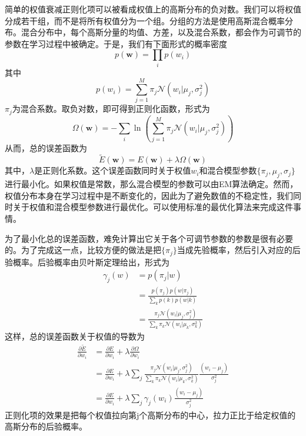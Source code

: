 简单的权值衰减正则化项可以被看成权值上的高斯分布的负对数。我们可以将权值分成若干组，而不是将所有权值分为一个组。分组的方法是使用高斯混合概率分布。混合分布中，每个高斯分量的均值、方差，以及混合系数，都会作为可调节的参数在学习过程中被确定。于是，我们有下面形式的概率密度
\begin{equation}
	p(\boldsymbol{w})=\prod_ip(w_i)
\end{equation}
其中
\begin{equation}
	p(w_i)=\sum_{j=1}^{M}\pi_j\mathcal{N}(w_i|\mu_j,\sigma_j^2)
\end{equation}
$\pi_j$为混合系数。取负对数，即可得到正则化函数，形式为
\begin{equation}
	\Omega(\boldsymbol{w})=-\sum_i\ln\left(\sum_{j=1}^{M}\pi_j\mathcal{N}(w_i|\mu_j,\sigma_j^2) \right)
\end{equation}
从而，总的误差函数为
\begin{equation}
	\tilde{E}(\boldsymbol{w})=E(\boldsymbol{w})+\lambda \Omega(\boldsymbol{w})
\end{equation}
其中，$\lambda$是正则化系数。这个误差函数同时关于权值$w_i$和混合模型参数$\{\pi_j,\mu_j,\sigma_j \}$进行最小化。如果权值是常数，那么混合模型的参数可以由EM算法确定。然而，权值分布本身在学习过程中是不断变化的，因此为了避免数值的不稳定性，我们同时关于权值和混合模型参数进行最优化。可以使用标准的最优化算法来完成这件事情。

为了最小化总的误差函数，难免计算出它关于各个可调节参数的参数是很有必要的。为了完成这一点，比较方便的做法是把$\{\pi_j \}$当成先验概率，然后引入对应的后验概率。后验概率由贝叶斯定理给出，形式为
\begin{equation}
\begin{aligned}
	\gamma_j(w)&=p(\pi_j|w)\\
	&=\frac{p(\pi_j)p(w|\pi_j)}{\sum_k p(k)p(w|k)}\\
	&=\frac{\pi_j\mathcal{N}(w_i|\mu_j,\sigma_j^2)}{\sum_k\pi_k\mathcal{N}(w_i|\mu_k,\sigma_k^2)}
\end{aligned}
\end{equation}
这样，总的误差函数关于权值的导数为
\begin{equation}
	\begin{aligned}
	\frac{\partial \tilde{E}}{\partial w_i}&=\frac{\partial E}{\partial w_i}+\lambda\frac{\partial \Omega}{\partial w_i}\\
	&=\frac{\partial E}{\partial w_i}+\lambda\sum_{j}\frac{\pi_j\mathcal{N}(w_i|\mu_j,\sigma_j^2)}{\sum_k\pi_k\mathcal{N}(w_i|\mu_k,\sigma_k^2)}\frac{(w_i-\mu_j)}{\sigma_j^2}\\
	&=\frac{\partial E}{\partial w_i}+\lambda\sum_{j}\gamma_j(w_i)\frac{(w_i-\mu_j)}{\sigma_j^2}
	\end{aligned}
\end{equation}
正则化项的效果是把每个权值拉向第j个高斯分布的中心，拉力正比于给定权值的高斯分布的后验概率。

